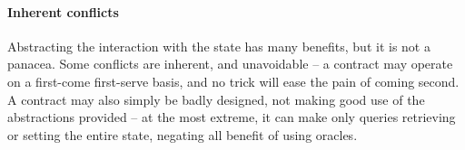 
\paragraph{Inherent conflicts}
Abstracting the interaction with the state has many benefits, but it is not a
panacea. Some conflicts are inherent, and unavoidable -- a contract may operate
on a first-come first-serve basis, and no trick will ease the pain of coming
second. A contract may also simply be badly designed, not making good use of
the abstractions provided -- at the most extreme, it can make only queries
retrieving or setting the entire state, negating all benefit of using oracles.
